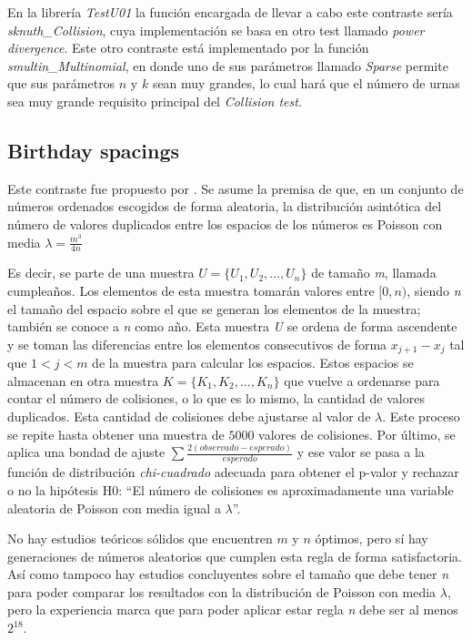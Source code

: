 \documentclass{article}
\begin{document}
En la librería \emph{TestU01} la función encargada de llevar a cabo este contraste sería \emph{sknuth\_Collision}, cuya implementación se basa en otro test llamado \emph{power divergence}. Este otro contraste está implementado por la función \emph{smultin\_Multinomial}, en donde uno de sus parámetros llamado \emph{Sparse} permite que sus parámetros $n$ y $k$ sean muy grandes, lo cual hará que el número de urnas sea muy grande requisito principal del \emph{Collision test}.

\subsection{Birthday spacings}

Este contraste fue propuesto por \citet{Marsaglia19853}. Se asume la premisa de que, en un conjunto de números ordenados escogidos de forma aleatoria, la distribución asintótica del número de valores duplicados entre los espacios de los números es Poisson con media $\lambda=\frac{m^3}{4n}$

Es decir, se parte de una muestra \textit{$U = \{U_1,U_2,...,U_n\}$} de tamaño \textit{m}, llamada cumpleaños. Los elementos de esta muestra tomarán valores entre $[0, n)$, siendo \textit{n} el tamaño del espacio sobre el que se generan los elementos de la muestra; también se conoce a \textit{n} como año. Esta muestra \textit{U} se ordena de forma ascendente y se toman las diferencias entre los elementos consecutivos de forma $x_{j+1}-x_j$  tal que $1 < j < m$ de la muestra para calcular los espacios. Estos espacios se almacenan en otra muestra \textit{$K = \{K_1,K_2,...,K_n\}$} que vuelve a ordenarse para contar el número de colisiones, o lo que es lo mismo, la cantidad de valores duplicados. Esta cantidad de colisiones debe ajustarse al valor de $\lambda$. Este proceso se repite hasta obtener una muestra de $5000$ valores de colisiones. Por último, se aplica una bondad de ajuste $\sum \frac{2(observado-esperado)}{esperado}$ y ese valor se pasa a la función de distribución \textit{chi-cuadrado} adecuada para obtener el p-valor y rechazar o no la hipótesis H0: “El número de colisiones es aproximadamente una variable aleatoria de Poisson con media igual a $\lambda$”. 

No hay estudios teóricos sólidos que encuentren $m$ y $n$ óptimos, pero sí hay generaciones de números aleatorios que cumplen esta regla de forma satisfactoria.  Así como tampoco hay estudios concluyentes sobre el tamaño que debe tener \textit{n} para poder comparar los resultados con la distribución de Poisson con media $\lambda$, pero la experiencia marca que para poder aplicar estar regla \textit{n} debe ser al menos $2^{18}$.  
\end{document}
